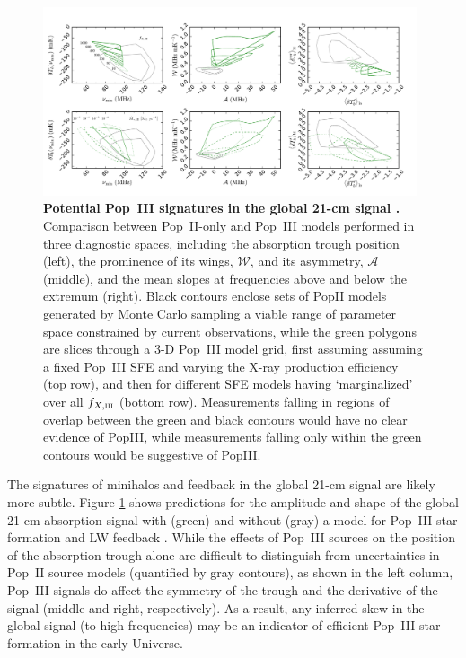 \begin{figure}[]
\begin{center}
\includegraphics[width=0.98\textwidth]{Mirocha/mirocha2018_fig6.pdf}
\end{center}
\caption{{\bf Potential Pop~III signatures in the global 21-cm signal \cite{Mirocha2018}.} Comparison between Pop~II-only and Pop~III models performed in three diagnostic spaces, including the absorption trough position (left), the prominence of its wings, $\mathcal{W}$, and its asymmetry, $\mathcal{A}$ (middle), and the mean slopes at frequencies above and below the extremum (right). Black contours enclose sets of PopII models generated by Monte Carlo sampling a viable range of parameter space constrained by current observations, while the green polygons are slices through a 3-D Pop~III model grid, first assuming assuming a fixed Pop~III SFE and varying the X-ray production efficiency (top row), and then for different SFE models having ‘marginalized’ over all $f_{X,\textsc{iii}}$ (bottom row). Measurements falling in regions of overlap between the green and black contours would have no clear evidence of PopIII, while measurements falling only within the green contours would be suggestive of PopIII.}
\label{fig:popIII_gs}
\end{figure}

The signatures of minihalos and feedback in the global 21-cm signal are likely more subtle. Figure \ref{fig:popIII_gs} shows predictions for the amplitude and shape of the global 21-cm absorption signal with (green) and without (gray) a model for Pop~III star formation and LW feedback \cite{Mirocha2018}. While the effects of Pop~III sources on the position of the absorption trough alone are difficult to distinguish from uncertainties in Pop~II source models (quantified by gray contours), as shown in the left column, Pop~III signals do affect the symmetry of the trough and the derivative of the signal (middle and right, respectively). As a result, any inferred skew in the global signal (to high frequencies) may be an indicator of efficient Pop~III star formation in the early Universe.


